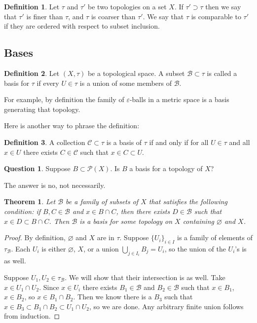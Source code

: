 \documentclass[12pt]{article}
\theoremstyle{plain}
\newtheorem{theorem}{Theorem}
\theoremstyle{definition}
\newtheorem{definition}{Definition}
\newtheorem{question}{Question}
\begin{document}
\begin{definition}
Let $\tau$ and $\tau'$ be two topologies on a set $X$. If $\tau' \supset \tau$ then we say that $\tau'$ is finer than $\tau$, and $\tau$ is coarser than $\tau'$. We say that $\tau$ is comparable to $\tau'$ if they are ordered with respect to subset inclusion.
\end{definition}

\subsection{Bases}

\begin{definition}
Let $(X, \tau)$ be a topological space. A subset $\mathcal{B} \subset \tau$ is called a basis for $\tau$ if every $U \in \tau$ is a union of some members of $\mathcal{B}$. 
\end{definition}

For example, by definition the family of $\varepsilon$-balls in a metric space is a basis generating that topology.

Here is another way to phrase the definition:
\begin{definition}
A collection $\mathcal{C} \subset \tau$ is a basis of $\tau$ if and only if for all $U \in \tau$ and all $x \in U$ there exists $C \in \mathcal{C}$ such that $x \in C \subset U$.
\end{definition}

\begin{question}
Suppose $B \subset \mathcal{P}(X)$. Is $B$ a basis for a topology of $X$?
\end{question}

The answer is no, not necessarily.

\begin{theorem}
Let $\mathcal{B}$ be a family of subsets of $X$ that satisfies the following condition: if $B, C \in \mathcal{B}$ and $x \in B \cap C$, then there exists $D \in \mathcal{B}$ such that $x \in D \subset B \cap C$.
Then $\mathcal{B}$ is a basis for some topology on $X$ containing $\varnothing$ and $X$.
\end{theorem}

\begin{proof}
By definition, $\varnothing$ and $X$ are in $\tau$. Suppose $\{U_i\}_{i \in I}$ is a family of elements of $\tau_{\mathcal{B}}$. Each $U_i$ is either $\varnothing$, $X$, or a union $\bigcup_{j \in I_i}B_j = U_i$, so the union of the $U_i$'s is as well.

Suppose $U_1, U_2 \in \tau_{\mathcal{B}}$. We will show that their intersection is as well. Take $x \in U_1 \cap U_2$. Since $x \in U_i$ there exists $B_1 \in \mathcal{B}$ and $B_2 \in \mathcal{B}$ such that $x \in B_1$, $x \in B_2$, so $x \in B_1 \cap B_2$. Then we know there is a $B_3$ such that $x \in B_3 \subset B_1 \cap B_2 \subset U_1 \cap U_2$, so we are done. Any arbitrary finite union follows from induction.
\end{proof}
\end{document}
